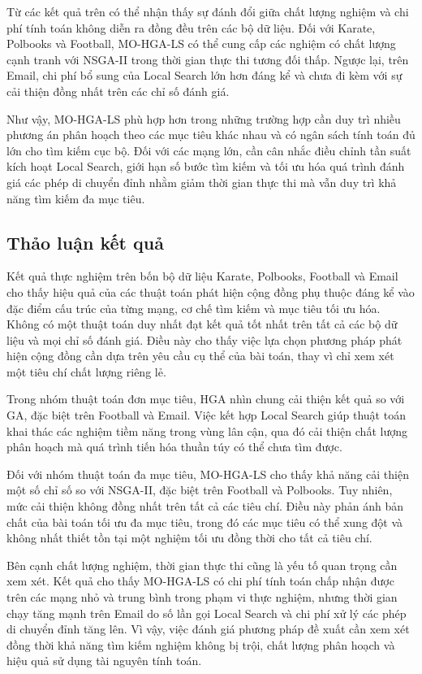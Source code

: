 \documentclass[14pt,a4paper]{extarticle}
\begin{document}
Từ các kết quả trên có thể nhận thấy sự đánh đổi giữa chất lượng nghiệm và chi phí tính toán không diễn ra đồng đều trên các bộ dữ liệu. Đối với Karate, Polbooks và Football, MO-HGA-LS có thể cung cấp các nghiệm có chất lượng cạnh tranh với NSGA-II trong thời gian thực thi tương đối thấp. Ngược lại, trên Email, chi phí bổ sung của Local Search lớn hơn đáng kể và chưa đi kèm với sự cải thiện đồng nhất trên các chỉ số đánh giá.

Như vậy, MO-HGA-LS phù hợp hơn trong những trường hợp cần duy trì nhiều phương án phân hoạch theo các mục tiêu khác nhau và có ngân sách tính toán đủ lớn cho tìm kiếm cục bộ. Đối với các mạng lớn, cần cân nhắc điều chỉnh tần suất kích hoạt Local Search, giới hạn số bước tìm kiếm và tối ưu hóa quá trình đánh giá các phép di chuyển đỉnh nhằm giảm thời gian thực thi mà vẫn duy trì khả năng tìm kiếm đa mục tiêu.

\subsection{Thảo luận kết quả}

Kết quả thực nghiệm trên bốn bộ dữ liệu Karate, Polbooks, Football và Email cho thấy hiệu quả của các thuật toán phát hiện cộng đồng phụ thuộc đáng kể vào đặc điểm cấu trúc của từng mạng, cơ chế tìm kiếm và mục tiêu tối ưu hóa. Không có một thuật toán duy nhất đạt kết quả tốt nhất trên tất cả các bộ dữ liệu và mọi chỉ số đánh giá. Điều này cho thấy việc lựa chọn phương pháp phát hiện cộng đồng cần dựa trên yêu cầu cụ thể của bài toán, thay vì chỉ xem xét một tiêu chí chất lượng riêng lẻ.

Trong nhóm thuật toán đơn mục tiêu, HGA nhìn chung cải thiện kết quả so với GA, đặc biệt trên Football và Email. Việc kết hợp Local Search giúp thuật toán khai thác các nghiệm tiềm năng trong vùng lân cận, qua đó cải thiện chất lượng phân hoạch mà quá trình tiến hóa thuần túy có thể chưa tìm được.

Đối với nhóm thuật toán đa mục tiêu, MO-HGA-LS cho thấy khả năng cải thiện một số chỉ số so với NSGA-II, đặc biệt trên Football và Polbooks. Tuy nhiên, mức cải thiện không đồng nhất trên tất cả các tiêu chí. Điều này phản ánh bản chất của bài toán tối ưu đa mục tiêu, trong đó các mục tiêu có thể xung đột và không nhất thiết tồn tại một nghiệm tối ưu đồng thời cho tất cả tiêu chí.

Bên cạnh chất lượng nghiệm, thời gian thực thi cũng là yếu tố quan trọng cần xem xét. Kết quả cho thấy MO-HGA-LS có chi phí tính toán chấp nhận được trên các mạng nhỏ và trung bình trong phạm vi thực nghiệm, nhưng thời gian chạy tăng mạnh trên Email do số lần gọi Local Search và chi phí xử lý các phép di chuyển đỉnh tăng lên. Vì vậy, việc đánh giá phương pháp đề xuất cần xem xét đồng thời khả năng tìm kiếm nghiệm không bị trội, chất lượng phân hoạch và hiệu quả sử dụng tài nguyên tính toán.
\end{document}
